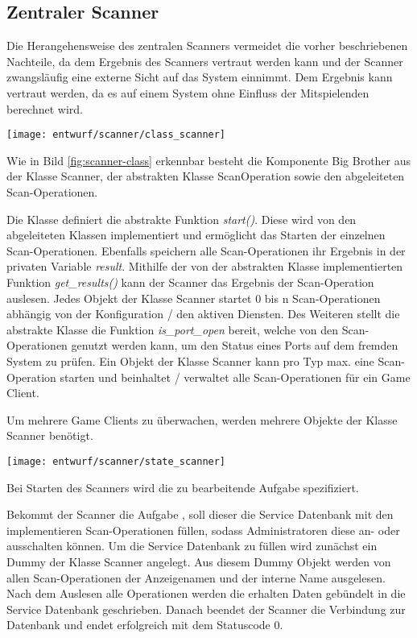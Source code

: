 \subsection{Zentraler Scanner}
Die Herangehensweise des zentralen Scanners vermeidet die vorher beschriebenen Nachteile, da dem Ergebnis des Scanners vertraut werden kann und der Scanner zwangsläufig eine externe Sicht auf das System einnimmt. Dem Ergebnis kann vertraut werden, da es auf einem System ohne Einfluss der Mitspielenden berechnet wird.

\begin{center}
	\texttt{[image: entwurf/scanner/class\_scanner]}
	\label{fig:scanner-class}
\end{center}

Wie in Bild \ref{fig:scanner-class} erkennbar besteht die Komponente Big Brother aus der Klasse Scanner, der abstrakten Klasse ScanOperation sowie den abgeleiteten Scan-Operationen.

Die Klasse  definiert die abstrakte Funktion \textit{start()}. Diese wird von den abgeleiteten Klassen implementiert und ermöglicht das Starten der einzelnen Scan-Operationen. Ebenfalls speichern alle Scan-Operationen ihr Ergebnis in der privaten Variable \textit{result}. Mithilfe der von der abstrakten Klasse implementierten Funktion \textit{get\_results()} kann der Scanner das Ergebnis der Scan-Operation auslesen. Jedes Objekt der Klasse Scanner startet 0 bis n Scan-Operationen abhängig von der Konfiguration / den aktiven Diensten. Des Weiteren stellt die abstrakte Klasse die Funktion \textit{is\_port\_open} bereit, welche von den Scan-Operationen genutzt werden kann, um den Status eines Ports auf dem fremden System zu prüfen. Ein Objekt der Klasse Scanner kann pro Typ max. eine Scan-Operation starten und beinhaltet / verwaltet alle Scan-Operationen für ein Game Client. 

Um mehrere Game Clients zu überwachen, werden mehrere Objekte der Klasse Scanner benötigt.

\begin{center}
	\texttt{[image: entwurf/scanner/state\_scanner]}
	\label{fig:scanner-state}
\end{center}

Bei Starten des Scanners wird die zu bearbeitende Aufgabe spezifiziert.

Bekommt der Scanner die Aufgabe , soll dieser die Service Datenbank mit den implementieren Scan-Operationen füllen, sodass Administratoren diese an- oder ausschalten können. Um die Service Datenbank zu füllen wird zunächst ein Dummy der Klasse Scanner angelegt. Aus diesem Dummy Objekt werden von allen Scan-Operationen der Anzeigenamen und der interne Name ausgelesen. Nach dem Auslesen alle Operationen werden die erhalten Daten gebündelt in die Service Datenbank geschrieben. Danach beendet der Scanner die Verbindung zur Datenbank und endet erfolgreich mit dem Statuscode 0.

